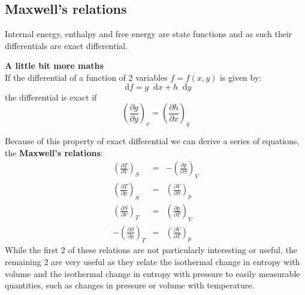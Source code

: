 \documentclass[12pt,a4paper]{report}
\newcommand*\diff{\mathop{}\!\mathrm{d}}
\begin{document}
   \subsection*{Maxwell's relations}
   Internal energy, enthalpy and free energy are state functions and as such their differentials  are exact differential.
   \begin{mdframed}
   \textbf{A little bit more maths}\\
   If the differential of a function of 2 variables  $f=f(x,y)$ is given by:
   \begin{equation*}
   \diff f= g \diff x + h \diff y
   \end{equation*}
   the differential is exact if 
   \begin{equation*}
   \left(\frac{\partial g}{\partial y}\right)_{x} = \left(\frac{\partial h}{\partial x}\right)_{y}
   \end{equation*}
   \end{mdframed}
   Because of this property of exact differential we can derive a series of equations, the \textbf{Maxwell's relations}:
   \begin{eqnarray*}
   \left(\frac{\partial T}{\partial V}\right)_{S}&=&-\left(\frac{\partial p}{\partial S}\right)_{V}\\ 
   \left(\frac{\partial T}{\partial p}\right)_{S}&=&\left(\frac{\partial V}{\partial S}\right)_{p}\\
   \left(\frac{\partial S}{\partial V}\right)_{T}&=&\left(\frac{\partial p}{\partial T}\right)_{V}\\
   -\left(\frac{\partial S}{\partial p}\right)_{T}&=&\left(\frac{\partial V}{\partial T}\right)_{p}
   \end{eqnarray*} 
   While the first 2 of these relations are not particularly interesting or useful, the remaining 2 are very useful as they relate the isothermal change in entropy with volume and the isothermal change in entropy with pressure to easily measurable quantities, such as changes in pressure or volume with temperature. 
\end{document}
